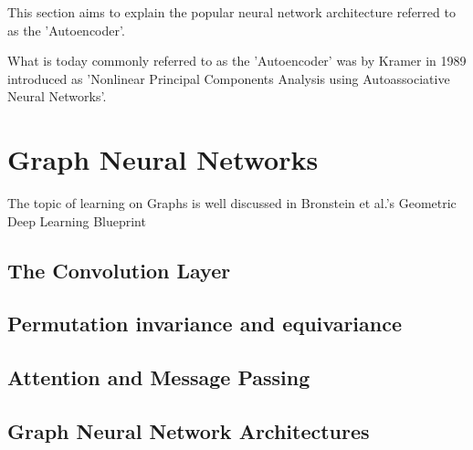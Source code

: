 This section aims to explain the popular neural network architecture referred to as the 'Autoencoder'.


What is today commonly referred to as the 'Autoencoder' was by Kramer in 1989
introduced as 'Nonlinear Principal Components Analysis using Autoassociative Neural Networks'\cite{autoencoderOrigin}.







\section{Graph Neural Networks}

The topic of learning on Graphs is well discussed in Bronstein et al.'s Geometric Deep Learning Blueprint \cite{geometricDeepLearningBlueprint}



\subsection{The Convolution Layer}
\subsection{Permutation invariance and equivariance}
\subsection{Attention and Message Passing}
\subsection{Graph Neural Network Architectures}

